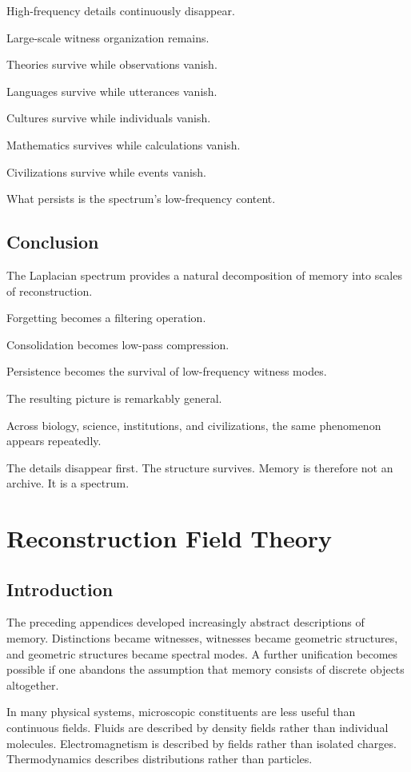 \documentclass[12pt,oneside]{book}
\theoremstyle{plain} \newtheorem{theorem}{Theorem}[chapter] \newtheorem{lemma}[theorem]{Lemma} \newtheorem{proposition}[theorem]{Proposition} \newtheorem{corollary}[theorem]{Corollary}
\theoremstyle{definition} \newtheorem{definition}[theorem]{Definition} \newtheorem{axiom}[theorem]{Axiom} \newtheorem{construction}[theorem]{Construction}
\theoremstyle{remark} \newtheorem{remark}[theorem]{Remark} \newtheorem{example}[theorem]{Example}
\begin{document}
High-frequency details continuously disappear.

Large-scale witness organization remains.

Theories survive while observations vanish.

Languages survive while utterances vanish.

Cultures survive while individuals vanish.

Mathematics survives while calculations vanish.

Civilizations survive while events vanish.

What persists is the spectrum's low-frequency content.

\section{Conclusion}

The Laplacian spectrum provides a natural decomposition of memory into scales of reconstruction.

Forgetting becomes a filtering operation.

Consolidation becomes low-pass compression.

Persistence becomes the survival of low-frequency witness modes.

The resulting picture is remarkably general.

Across biology, science, institutions, and civilizations, the same phenomenon appears repeatedly.

The details disappear first. The structure survives.
Memory is therefore not an archive. It is a spectrum.

\chapter{Reconstruction Field Theory}

\section{Introduction}

The preceding appendices developed increasingly abstract descriptions of memory. Distinctions became witnesses, witnesses became geometric structures, and geometric structures became spectral modes. A further unification becomes possible if one abandons the assumption that memory consists of discrete objects altogether.

In many physical systems, microscopic constituents are less useful than continuous fields. Fluids are described by density fields rather than individual molecules. Electromagnetism is described by fields rather than isolated charges. Thermodynamics describes distributions rather than particles.
\end{document}

